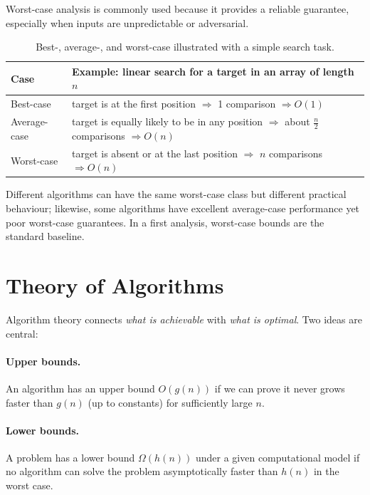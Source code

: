\documentclass[12pt]{scrartcl}
\begin{document}
Worst-case analysis is commonly used because it provides a reliable guarantee, especially when inputs are unpredictable or adversarial.

\begin{table}[h]
	\centering
	\caption{Best-, average-, and worst-case illustrated with a simple search task.}
	\begin{tabular}{@{}p{} p{}@{}}
		\toprule
		Case         & Example: linear search for a target in an array of length \(n\)                                                       \\ \midrule
		Best-case    & target is at the first position \(\Rightarrow\) 1 comparison \(\Rightarrow O(1)\)                                     \\
		Average-case & target is equally likely to be in any position \(\Rightarrow\) about \(\frac{n}{2}\) comparisons \(\Rightarrow O(n)\) \\
		Worst-case   & target is absent or at the last position \(\Rightarrow\) \(n\) comparisons \(\Rightarrow O(n)\)                       \\
		\bottomrule
	\end{tabular}
\end{table}

Different algorithms can have the same worst-case class but different practical behaviour; likewise, some algorithms have excellent average-case performance yet poor worst-case guarantees. In a first analysis, worst-case bounds are the standard baseline.

\section{Theory of Algorithms}
Algorithm theory connects \emph{what is achievable} with \emph{what is optimal}. Two ideas are central:

\paragraph{Upper bounds.}
An algorithm has an upper bound \(O(g(n))\) if we can prove it never grows faster than \(g(n)\) (up to constants) for sufficiently large \(n\).

\paragraph{Lower bounds.}
A problem has a lower bound \(\Omega(h(n))\) under a given computational model if no algorithm can solve the problem asymptotically faster than \(h(n)\) in the worst case.
\end{document}
